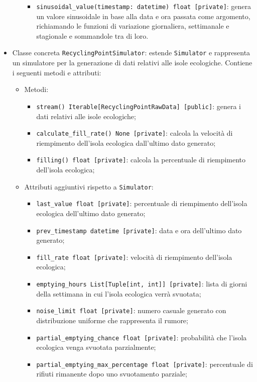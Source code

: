 \begin{itemize}
\begin{itemize}
\begin{itemize}
            \item \texttt{sinusoidal\_value(timestamp: datetime) float [private]}: genera un valore sinusoidale in base alla data e ora passata come argomento, richiamando le funzioni di variazione giornaliera, settimanale e stagionale e sommandole tra di loro.
        \end{itemize}
    \end{itemize}
    \item Classe concreta \texttt{RecyclingPointSimulator}: estende \texttt{Simulator} e rappresenta un simulatore per la generazione di dati relativi alle isole ecologiche. Contiene i seguenti metodi e attributi:
    \begin{itemize}
        \item Metodi:
        \begin{itemize}
            \item \texttt{stream() Iterable[RecyclingPointRawData] [public]}: genera i dati relativi alle isole ecologiche;
            \item \texttt{calculate\_fill\_rate() None [private]}: calcola la velocità di riempimento dell'isola ecologica dall'ultimo dato generato;
            \item \texttt{filling() float [private]}: calcola la percentuale di riempimento dell'isola ecologica;
        \end{itemize}
        \item Attributi aggiuntivi rispetto a \texttt{Simulator}:
        \begin{itemize}
            \item \texttt{last\_value float [private]}: percentuale di riempimento dell'isola ecologica dell'ultimo dato generato;
            \item \texttt{prev\_timestamp datetime [private]}: data e ora dell'ultimo dato generato;
            \item \texttt{fill\_rate float [private]}: velocità di riempimento dell'isola ecologica;
            \item \texttt{emptying\_hours List[Tuple[int, int]] [private]}: lista di giorni della settimana in cui l'isola ecologica verrà svuotata;
            \item \texttt{noise\_limit float [private]}: numero casuale generato con distribuzione uniforme che rappresenta il rumore;
            \item \texttt{partial\_emptying\_chance float [private]}: probabilità che l'isola ecologica venga svuotata parzialmente;
            \item \texttt{partial\_emptying\_max\_percentage float [private]}: percentuale di rifiuti rimanente dopo uno svuotamento parziale;

\end{itemize}
\end{itemize}
\end{itemize}
